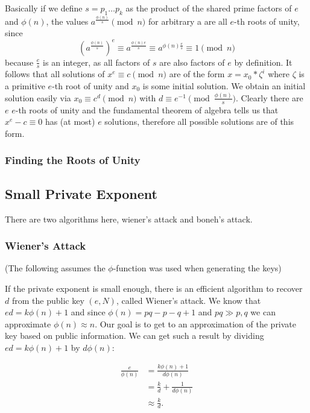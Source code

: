 Basically if we define $s = p_1\dots p_k$ as the product of the shared prime factors of $e$ and $\phi(n)$, the values $a^{\frac{\phi(n)}{s}} \pmod{n}$ for arbitrary a are all $e$-th roots of unity, since
\[(a^{\frac{\phi(n)}{s}})^e \equiv a^{\frac{\phi(n)e}{s}} \equiv a^{\phi(n)\frac{e}{s}} \equiv 1 \pmod{n}\]
  because $\frac{e}{s}$ is an integer, as all factors of $s$ are also factors of $e$ by definition. It follows that all solutions of $x^e \equiv c \pmod{n}$ are of the form $x = x_0 * \zeta^i$ where $\zeta$ is a primitive $e$-th root of unity and $x_0$ is some initial solution. We obtain an initial solution easily via $x_0 \equiv c^d \pmod{n}$ with $d \equiv e^{-1} \pmod{\frac{\phi(n)}{s}}$. Clearly there are $e$ $e$-th roots of unity and the fundamental theorem of algebra tells us that $x^e - c \equiv 0$ has (at most) $e$ solutions, therefore all possible solutions are of this form.

\subsubsection{Finding the Roots of Unity}

\subsection{Small Private Exponent}

There are two algorithms here, wiener's attack and boneh's attack.

\subsubsection{Wiener's Attack}

(The following assumes the $\phi$-function was used when generating the keys)

If the private exponent is small enough, there is an efficient algorithm to recover $d$ from the public key $(e, N)$, called Wiener's attack. We know that $ed = k\phi(n) + 1$ and since $\phi(n) = pq - p - q + 1$ and $pq \gg p,q$ we can approximate $\phi(n) \approx n$. Our goal is to get to an approximation of the private key based on public information. We can get such a result by dividing $ed = k\phi(n) + 1$ by $d\phi(n)$:

\begin{align*}
  \frac{e}{\phi(n)}
  &= \frac{k\phi(n) + 1}{d\phi(n)} \\
  &= \frac{k}{d} + \frac{1}{d\phi(n)} \\
  &\approx \frac{k}{d}. \\
\end{align*}

